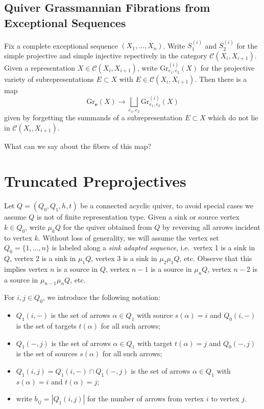 \documentclass{amsart}
\numberwithin{equation}{section}
\newcommand{\bfe}{\mathbf{e}}
\newcommand{\cC}{\mathcal{C}}
\newcommand{\Gr}{\mathrm{Gr}}
\begin{document}
\subsection{Quiver Grassmannian Fibrations from Exceptional Sequences}

Fix a complete exceptional sequence $(X_1,\ldots,X_n)$.
Write $S_1^{(i)}$ and $S_2^{(i)}$ for the simple projective and simple injective repectively in the category $\cC(X_i,X_{i+1})$.
Given a representation $X\in\cC(X_i,X_{i+1})$, write $\Gr^{(i)}_{e_1,e_2}(X)$ for the projective variety of subrepresentations $E\subset X$ with $E\in\cC(X_i,X_{i+1})$.
Then there is a map
\[\Gr_\bfe(X)\to\bigsqcup_{e_1,e_2} \Gr^{(i)}_{e_1,e_2}(X)\]
given by forgetting the summands of a subrepresentation $E\subset X$ which do not lie in $\cC(X_i,X_{i+1})$.

What can we say about the fibers of this map?



\section{Truncated Preprojectives}

Let $Q=(Q_0,Q_1,h,t)$ be a connected acyclic quiver, to avoid special cases we assume $Q$ is not of finite representation type.
Given a sink or source vertex $k\in Q_0$, write $\mu_k Q$ for the quiver obtained from $Q$ by reversing all arrows incident to vertex $k$.
Without loss of generality, we will assume the vertex set $Q_0=\{1,\ldots,n\}$ is labeled along a \emph{sink adapted sequence}, i.e.~vertex 1 is a sink in $Q$, vertex $2$ is a sink in $\mu_1 Q$, vertex $3$ is a sink in $\mu_2\mu_1 Q$, etc.
Observe that this implies vertex $n$ is a source in $Q$, vertex $n-1$ is a source in $\mu_n Q$, vertex $n-2$ is a source in $\mu_{n-1}\mu_n Q$, etc.

For $i,j\in Q_0$, we introduce the following notation:
\begin{itemize}
  \item $Q_1(i,-)$ is the set of arrows $\alpha\in Q_1$ with source $s(\alpha)=i$ and $Q_0(i,-)$ is the set of targets $t(\alpha)$ for all such arrows;
  \item $Q_1(-,j)$ is the set of arrows $\alpha\in Q_1$ with target $t(\alpha)=j$ and $Q_0(-,j)$ is the set of sources $s(\alpha)$ for all such arrows;
  \item $Q_1(i,j)=Q_1(i,-)\cap Q_1(-,j)$ is the set of arrows $\alpha\in Q_1$ with $s(\alpha)=i$ and $t(\alpha)=j$;
  \item write $b_{ij}=|Q_1(i,j)|$ for the number of arrows from vertex $i$ to vertex $j$.
\end{itemize}
\end{document}
